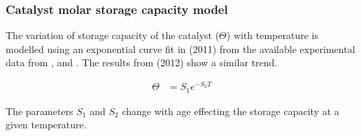 \subsubsection{Catalyst molar storage capacity model}
The variation of storage capacity of the catalyst ($\Theta$) with temperature is
modelled using an exponential curve fit in \cite{hsieh2011development} (2011)
from the available experimental data from
\cite{willems2007closed}, \cite{ciardelli2004scr} and \cite{joo2008study}.  The
results from \cite{schmieg2012thermal} (2012) show a similar trend.

\begin{align*}
    \Theta &= S_1 e^{-S_2 T}
\end{align*}

The parameters $S_1$ and $S_2$ change with age effecting the storage capacity at
a given temperature.


